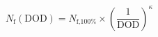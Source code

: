 \documentclass[preview]{standalone}
\begin{document}
\[N_\text{f}(\text{DOD}) = N_\text{f,100\%} \times \left(\frac{1}{\text{DOD}}\right)^\kappa \tag{7.16}\]
\end{document}
